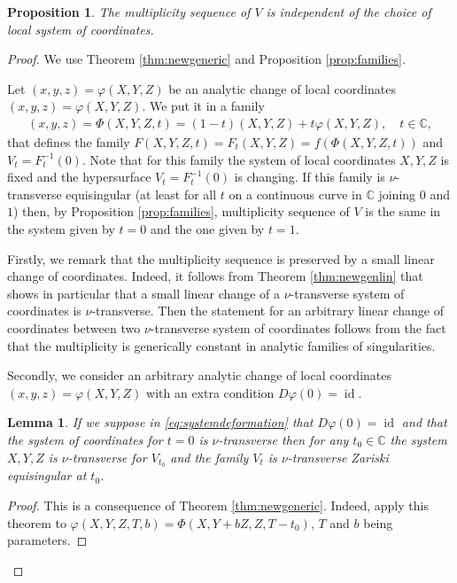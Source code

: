 \documentclass[11pt,a4paper]{amsart}
\newcommand{\1}{{1\!\!1}}
\numberwithin{equation}{section}
\theoremstyle{plain}%
\newtheorem{lemma}[thm]{Lemma}
\newtheorem{prop}[thm]{Proposition}
\theoremstyle{definition}
\theoremstyle{definition}
\theoremstyle{remark}
\newcommand{\C}{\mathbb{C}}
\renewcommand{\1}{\mathbf{1}}
\newcommand{\inv}{^{-1}}
\DeclareMathOperator{\id}{id}
\newcommand{\impli}{\varphi}
\newcommand{\snt}{$\nu$-transverse}
\newcommand{\unt}{$\nu$-transverse }
\newcommand{\multseq}{multiplicity sequence }
\begin{document}
\begin{prop}\label{prop:multindep}
The \multseq of $V$ is independent of the choice of local system of coordinates.    
\end{prop}

\begin{proof}
We use Theorem \ref{thm:newgeneric} and Proposition \ref{prop:families}. 

Let $(x,y,z) = \impli (X,Y,Z)$ be an analytic change of local coordinates $(x,y,z) = \impli (X,Y,Z)$.  We put it in a family 
\begin{align}\label{eq:systemdeformation} 
(x,y,z)= \Phi (X,Y,Z,t)= (1-t)(X,Y,Z) + t \impli (X,Y,Z), \quad t\in \C,     
\end{align}
that defines the family   
$F(X,Y,Z,t)=F_t(X,Y,Z)=  f(\Phi (X,Y,Z,t))$ and   $V_t=F_t\inv (0)$.   Note that for this family the system of local coordinates $X,Y,Z$ is fixed and the hypersurface $V_t=F_t\inv (0)$ is changing. 
If this family is \unt equisingular (at least for all $t$ on a continuous curve in $\C$ joining $0$ and $1$) then, by Proposition \ref{prop:families},  \multseq of $V$ is the same in the system given by $t=0$ and the one given by $t=1$.   

Firstly, we remark that the \multseq is preserved by a small linear change of coordinates.  Indeed, it follows from Theorem \ref{thm:newgenlin} that shows in particular that a small linear change of a \unt system of coordinates is \snt.  Then the statement for an arbitrary linear change of coordinates between two \unt system of coordinates follows from the fact that the multiplicity is generically constant in analytic families of singularities.  


Secondly, we consider an arbitrary analytic change of local coordinates 
$(x,y,z) = \impli (X,Y,Z)$ with an extra condition $D \impli (0) = \id $.  

\begin{lemma}\label{lem:nutransverse1}
  If we suppose in \eqref{eq:systemdeformation}  that $D \impli (0) = \id $ and that the system of coordinates for $t=0$ is \unt 
  then for any $t_0 \in \C $ the system $X,Y,Z$ is \unt for $V_{t_0}$ 
 and the family $V_{t}$ is \unt Zariski equisingular at $t_0$. 
\end{lemma}

\begin{proof}
  This is a consequence of Theorem \ref{thm:newgeneric}. Indeed, apply this theorem to   $\varphi (X,Y,Z,T, b) = \Phi ( X, Y+bZ,Z,T-t_0 )  $, $T$ and $b$ being parameters.  
 \end{proof}



\end{proof}
\end{document}
